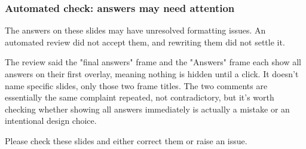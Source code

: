 \documentclass{beamer}
\begin{document}
\begin{frame}
\frametitle{Automated check: answers may need attention}
The answers on these slides may have unresolved formatting issues. An automated
review did not accept them, and rewriting them did not settle it.

The review said the "final answers" frame and the "Answers" frame each show all answers on their first overlay, meaning nothing is hidden until a click. It doesn't name specific slides, only those two frame titles. The two comments are essentially the same complaint repeated, not contradictory, but it's worth checking whether showing all answers immediately is actually a mistake or an intentional design choice.

Please check these slides and either correct them or raise an issue.
\end{frame}
\end{document}
